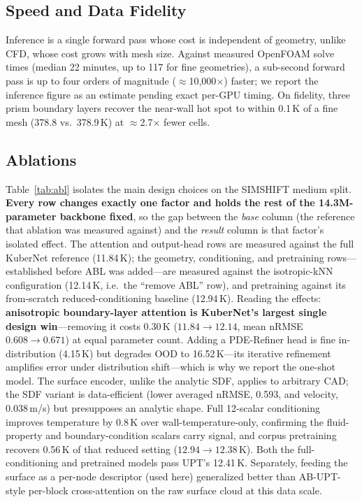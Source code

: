 \documentclass[conference]{IEEEtran}
\begin{document}
\subsection{Speed and Data Fidelity}
Inference is a single forward pass whose cost is independent of geometry, unlike CFD, whose cost grows
with mesh size. Against measured OpenFOAM solve times (median 22 minutes, up to 117 for fine
geometries), a sub-second forward pass is up to four orders of magnitude ($\approx$10,000$\times$)
faster; we report the inference figure as an estimate pending exact per-GPU timing. On fidelity, three prism boundary
layers recover the near-wall hot spot to within 0.1\,K of a fine mesh (378.8 vs.\ 378.9\,K) at
$\approx$2.7$\times$ fewer cells.

\subsection{Ablations}\label{sec:ablation}
Table~\ref{tab:abl} isolates the main design choices on the SIMSHIFT medium split. \textbf{Every row changes
exactly one factor and holds the rest of the 14.3M-parameter backbone fixed}, so the gap between the
\emph{base} column (the reference that ablation was measured against) and the \emph{result} column is that
factor's isolated effect. The attention and output-head rows are measured against the full KuberNet reference
(11.84\,K); the geometry, conditioning, and pretraining rows---established before ABL was added---are measured
against the isotropic-kNN configuration (12.14\,K, i.e.\ the ``remove ABL'' row), and pretraining against its
from-scratch reduced-conditioning baseline (12.94\,K). Reading the effects: \textbf{anisotropic boundary-layer
attention is KuberNet's largest single design win}---removing it costs 0.30\,K ($11.84\!\to\!12.14$, mean nRMSE
$0.608\!\to\!0.671$) at equal parameter count. Adding a PDE-Refiner head is fine in-distribution (4.15\,K) but
degrades OOD to 16.52\,K---its iterative refinement amplifies error under distribution shift---which is why we
report the one-shot model. The surface encoder, unlike the analytic SDF, applies to arbitrary CAD; the SDF
variant is data-efficient (lower averaged nRMSE, 0.593, and velocity, 0.038\,m/s) but presupposes an analytic
shape. Full 12-scalar conditioning improves temperature by 0.8\,K over wall-temperature-only, confirming the
fluid-property and boundary-condition scalars carry signal, and corpus pretraining recovers 0.56\,K of that
reduced setting ($12.94\!\to\!12.38$\,K). Both the full-conditioning and pretrained models pass UPT's
12.41\,K. Separately, feeding the surface as a per-node descriptor (used here) generalized better than
AB-UPT-style per-block cross-attention on the raw surface cloud at this data scale.
\end{document}
